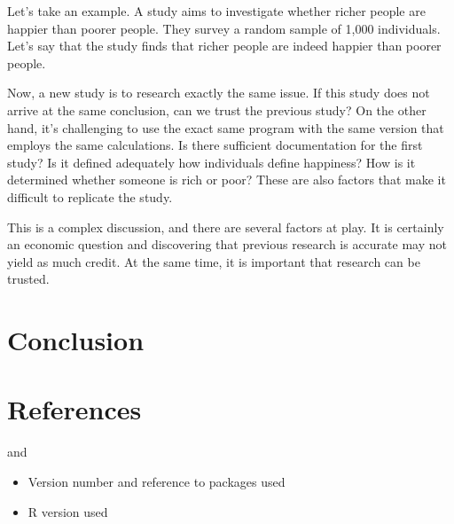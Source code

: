 \documentclass[
  a4paper,
]{article}
\providecommand{\tightlist}{%
  \setlength{\itemsep}{0pt}\setlength{\parskip}{0pt}}\usepackage{longtable,booktabs,array}
\begin{document}
Let's take an example. A study aims to investigate whether richer people
are happier than poorer people. They survey a random sample of 1,000
individuals. Let's say that the study finds that richer people are
indeed happier than poorer people.

Now, a new study is to research exactly the same issue. If this study
does not arrive at the same conclusion, can we trust the previous study?
On the other hand, it's challenging to use the exact same program with
the same version that employs the same calculations. Is there sufficient
documentation for the first study? Is it defined adequately how
individuals define happiness? How is it determined whether someone is
rich or poor? These are also factors that make it difficult to replicate
the study.

This is a complex discussion, and there are several factors at play. It
is certainly an economic question and discovering that previous research
is accurate may not yield as much credit. At the same time, it is
important that research can be trusted.

\section{Conclusion}\label{conclusion}

\section{References}\label{references}

and

\begin{itemize}
\tightlist
\item
  Version number and reference to packages used
\item
  R version used
\end{itemize}
\end{document}
